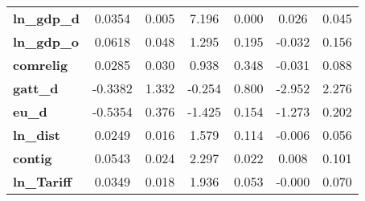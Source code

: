 \begin{center}
\begin{tabular}{lcccccc}
\textbf{ln\_gdp\_d}                                                &       0.0354  &        0.005     &     7.196  &         0.000        &        0.026    &        0.045     \\
\textbf{ln\_gdp\_o}                                                &       0.0618  &        0.048     &     1.295  &         0.195        &       -0.032    &        0.156     \\
\textbf{comrelig}                                                  &       0.0285  &        0.030     &     0.938  &         0.348        &       -0.031    &        0.088     \\
\textbf{gatt\_d}                                                   &      -0.3382  &        1.332     &    -0.254  &         0.800        &       -2.952    &        2.276     \\
\textbf{eu\_d}                                                     &      -0.5354  &        0.376     &    -1.425  &         0.154        &       -1.273    &        0.202     \\
\textbf{ln\_dist}                                                  &       0.0249  &        0.016     &     1.579  &         0.114        &       -0.006    &        0.056     \\
\textbf{contig}                                                    &       0.0543  &        0.024     &     2.297  &         0.022        &        0.008    &        0.101     \\
\textbf{ln\_Tariff}                                                &       0.0349  &        0.018     &     1.936  &         0.053        &       -0.000    &        0.070     \\
\bottomrule
\end{tabular}
\end{center}